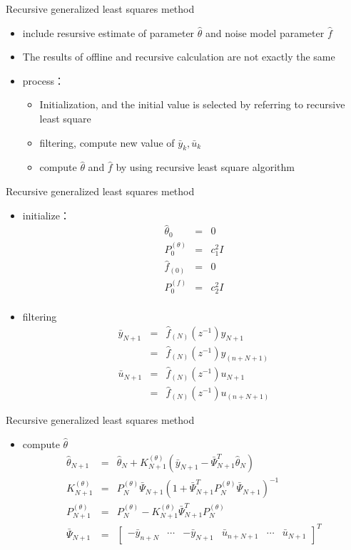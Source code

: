 \begin{frame}{ Recursive generalized least squares method }
\begin{itemize}
\item include resursive estimate of parameter $\hat\theta$ and noise model parameter $\hat f$
\item  The results of offline and recursive calculation are not exactly the same 
\item process：
\begin{itemize}
\item  Initialization, and the initial value is selected by referring to recursive least square 
\item filtering, compute new value of $\bar y_k,\bar u_k$
\item  compute $\hat\theta$ and $\hat f$ by using recursive least square algorithm
\end{itemize}
\end{itemize}
\end{frame}

\begin{frame}{ Recursive generalized least squares method }
\begin{itemize}
\item initialize：\
\begin{eqnarray*}
\hat\theta_0 &=& 0 \\
P_0^{(\theta)} &=& c_1^2 I \\
\hat f_{(0)} &=& 0 \\
P_0^{(f)} &=& c_2^2 I \\
\end{eqnarray*}
\item filtering
\begin{eqnarray*}
\bar y_{N+1} &=& \hat f_{(N)}(z^{-1}) y_{N+1} \\
&=& \hat f_{(N)}(z^{-1}) y_{(n+N+1)} \\
\bar u_{N+1} &=& \hat f_{(N)}(z^{-1}) u_{N+1} \\
&=& \hat f_{(N)}(z^{-1}) u_{(n+N+1)} 
\end{eqnarray*}
\end{itemize}
\end{frame}

\begin{frame}{ Recursive generalized least squares method }
\begin{itemize}
\item compute $\hat\theta$
\begin{eqnarray*}
\hat\theta_{N+1} &=& \hat\theta_N+K_{N+1}^{(\theta)}(\bar y_{N+1}-\bar\Psi_{N+1}^T\hat\theta_N) \\
K_{N+1}^{(\theta)}&=& P_N^{(\theta)}\bar\Psi_{N+1}(1+\bar\Psi_{N+1}^T P_N^{(\theta)}\bar\Psi_{N+1})^{-1} \\
P_{N+1}^{(\theta)} &=& P_N^{(\theta)}-K_{N+1}^{(\theta)}\bar\Psi_{N+1}^T P_N^{(\theta)} \\
\bar\Psi_{N+1} &=& \begin{bmatrix}-\bar y_{n+N} &\cdots & -\bar y_{N+1} & \bar u_{n+N+1} &\cdots & \bar u_{N+1} \end{bmatrix}^T 
\end{eqnarray*}
\end{itemize}
\end{frame}

